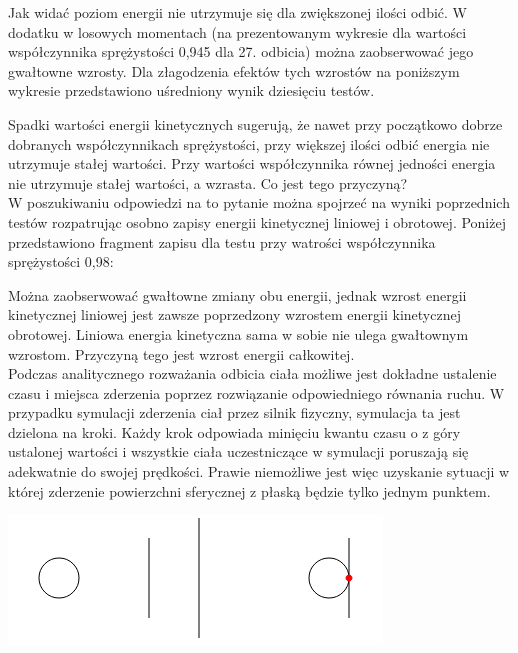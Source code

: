 

Jak widać poziom energii nie utrzymuje się dla zwiększonej ilości odbić. W
dodatku w losowych momentach (na prezentowanym wykresie dla wartości
współczynnika sprężystości 0,945 dla 27. odbicia) można zaobserwować jego
gwałtowne wzrosty. Dla złagodzenia efektów tych wzrostów na poniższym wykresie
przedstawiono uśredniony wynik dziesięciu testów.



Spadki wartości energii kinetycznych sugerują, że nawet przy początkowo dobrze
dobranych współczynnikach sprężystości, przy większej ilości odbić energia nie
utrzymuje stałej wartości. Przy wartości współczynnika równej jedności energia
nie utrzymuje stałej wartości, a wzrasta. Co jest tego przyczyną? \\
W poszukiwaniu odpowiedzi na to pytanie można spojrzeć na wyniki poprzednich
testów rozpatrując osobno zapisy energii kinetycznej liniowej i obrotowej.
Poniżej przedstawiono fragment zapisu dla testu przy watrości współczynnika
sprężystości 0,98:


  
Można zaobserwować gwałtowne zmiany obu energii, jednak wzrost energii
kinetycznej liniowej jest zawsze poprzedzony wzrostem energii kinetycznej
obrotowej. Liniowa energia kinetyczna sama w sobie nie ulega gwałtownym
wzrostom. Przyczyną tego jest wzrost energii całkowitej.\\
Podczas analitycznego rozważania odbicia ciała możliwe jest dokładne ustalenie
czasu i miejsca zderzenia poprzez rozwiązanie odpowiedniego równania ruchu. W
przypadku symulacji zderzenia ciał przez silnik fizyczny, symulacja ta jest
dzielona na kroki. Każdy krok odpowiada minięciu kwantu czasu o z góry ustalonej
wartości i wszystkie ciała uczestniczące w symulacji poruszają się adekwatnie do
swojej prędkości. Prawie niemożliwe jest więc uzyskanie sytuacji w której
zderzenie powierzchni sferycznej z płaską będzie tylko jednym punktem.

\begin{center}
\includegraphics{./img/zderzenie1.png}
\end{center}

